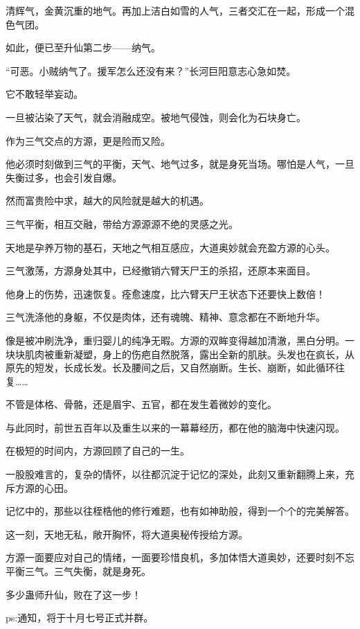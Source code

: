 \begin{this_body}
清辉气，金黄沉重的地气。再加上洁白如雪的人气，三者交汇在一起，形成一个混色气团。

如此，便已至升仙第二步——纳气。

“可恶。小贼纳气了。援军怎么还没有来？”长河巨阳意志心急如焚。

它不敢轻举妄动。

一旦被沾染了天气，就会消融成空。被地气侵蚀，则会化为石块身亡。

作为三气交点的方源，更是险而又险。

他必须时刻做到三气的平衡，天气、地气过多，就是身死当场。哪怕是人气，一旦失衡过多，也会引发自爆。

然而富贵险中求，越大的风险就是越大的机遇。

三气平衡，相互交融，带给方源源源不绝的灵感之光。

天地是孕养万物的基石，天地之气相互感应，大道奥妙就会充盈方源的心头。

三气激荡，方源身处其中，已经撤销六臂天尸王的杀招，还原本来面目。

他身上的伤势，迅速恢复。痊愈速度，比六臂天尸王状态下还要快上数倍！

三气洗涤他的身躯，不仅是肉体，还有魂魄、精神、意念都在不断地升华。

像是被冲刷洗净，重归婴儿的纯净无暇。方源的双眸变得越加清澈，黑白分明。一块块肌肉被重新凝塑，身上的伤疤自然脱落，露出全新的肌肤。头发也在疯长，从原先的短发，长成长发。长及腰间之后，又自然崩断。生长、崩断，如此循环往复……

不管是体格、骨骼，还是眉宇、五官，都在发生着微妙的变化。

与此同时，前世五百年以及重生以来的一幕幕经历，都在他的脑海中快速闪现。

在极短的时间内，方源回顾了自己的一生。

一股股难言的，复杂的情怀，以往都沉淀于记忆的深处，此刻又重新翻腾上来，充斥方源的心田。

记忆中的，那些以往桎梏他的修行难题，也有如神助般，得到一个个的完美解答。

这一刻，天地无私，敞开胸怀，将大道奥秘传授给方源。

方源一面要应对自己的情绪，一面要珍惜良机，多加体悟大道奥妙，还要时刻不忘平衡三气。三气失衡，就是身死。

多少蛊师升仙，败在了这一步！

ps:通知，将于十月七号正式并群。

\end{this_body}

